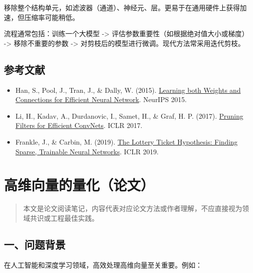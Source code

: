 移除整个结构单元，如滤波器（通道）、神经元、层。更易于在通用硬件上获得加速，但压缩率可能稍低。

流程通常包括：训练一个大模型 -\textgreater{} 评估参数重要性（如根据绝对值大小或梯度） -\textgreater{} 移除不重要的参数 -\textgreater{} 对剪枝后的模型进行微调。现代方法常采用迭代剪枝。

\hypertarget{ux53c2ux8003ux6587ux732e-88}{%
\subsection{参考文献}\label{ux53c2ux8003ux6587ux732e-88}}

\begin{itemize}
\tightlist
\item
  Han, S., Pool, J., Tran, J., \& Dally, W. (2015). \href{https://papers.nips.cc/paper_files/paper/2015/hash/ae0eb3eed39d2bcef4622b2499a05fe6-Abstract.html}{Learning both Weights and Connections for Efficient Neural Network}. NeurIPS 2015.
\item
  Li, H., Kadav, A., Durdanovic, I., Samet, H., \& Graf, H. P. (2017). \href{https://openreview.net/forum?id=rJqFGTslg}{Pruning Filters for Efficient ConvNets}. ICLR 2017.
\item
  Frankle, J., \& Carbin, M. (2019). \href{https://openreview.net/forum?id=rJl-b3RcF7}{The Lottery Ticket Hypothesis: Finding Sparse, Trainable Neural Networks}. ICLR 2019.
\end{itemize}

\clearpage

\hypertarget{ux9ad8ux7ef4ux5411ux91cfux7684ux91cfux5316ux8bbaux6587}{%
\section{高维向量的量化（论文）}\label{ux9ad8ux7ef4ux5411ux91cfux7684ux91cfux5316ux8bbaux6587}}

\begin{quote}
本文是论文阅读笔记，内容代表对应论文方法或作者理解，不应直接视为领域共识或工程最佳实践。
\end{quote}

\hypertarget{ux4e00ux95eeux9898ux80ccux666f}{%
\subsection{一、问题背景}\label{ux4e00ux95eeux9898ux80ccux666f}}

在人工智能和深度学习领域，高效处理高维向量至关重要。例如：

